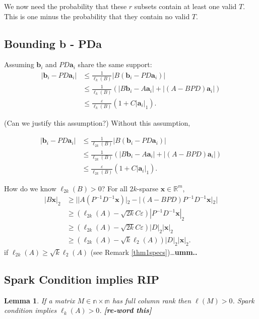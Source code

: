 \documentclass[journal, onecolumn]{IEEEtran}
\newtheorem{lemma}{Lemma}
\begin{document}
We now need the probability that these $r$ subsets contain at least one valid $T$.  This is one minus the probability that they contain no valid $T$. 

\subsection{Bounding b - PDa}

Assuming $\mathbf{b}_i$ and $PD\mathbf{a}_i$ share the same support:
\begin{align*}
|\mathbf{b}_i - PD\mathbf{a}_i| 
&\leq \frac{1}{\ell_{k}(B)}|B(\mathbf{b}_i - PD\mathbf{a}_i)| \\
&\leq \frac{1}{\ell_{k}(B)} (|B\mathbf{b}_i - A\mathbf{a}_i| + |(A - BPD)\mathbf{a}_i|) \\
&\leq \frac{\varepsilon}{\ell_{k}(B)}(1+C|\mathbf{a}_i|_1).
\end{align*}

(Can we justify this assumption?) Without this assumption,

\begin{align*}
|\mathbf{b}_i - PD\mathbf{a}_i| 
&\leq \frac{1}{\ell_{2k}(B)}|B(\mathbf{b}_i - PD\mathbf{a}_i)| \\
&\leq \frac{1}{\ell_{2k}(B)} (|B\mathbf{b}_i - A\mathbf{a}_i| + |(A - BPD)\mathbf{a}_i|) \\
&\leq \frac{\varepsilon}{\ell_{2k}(B)}(1+C|\mathbf{a}_i|_1).
\end{align*}

How do we know $\ell_{2k}(B) > 0$? For all $2k$-sparse $\mathbf{x} \in \mathbb{R}^m$,
\begin{align*}
|B\mathbf{x}|_2 
&\geq | |A(P^{-1}D^{-1}\mathbf{x})|_2 - |(A-BPD)P^{-1}D^{-1}\mathbf{x}|_2 | \\
&\geq (\ell_{2k}(A) - \sqrt{2k}C\varepsilon)|P^{-1}D^{-1}\mathbf{x}|_2 \\
&\geq (\ell_{2k}(A) - \sqrt{2k}C\varepsilon)|D|_2|\mathbf{x}|_2 \\
&\geq (\ell_{2k}(A) - \sqrt{k}\ell_2(A))|D|_2|\mathbf{x}|_2. 
\end{align*}
%
if $\ell_{2k}(A) \geq \sqrt{k}\ell_2(A)$ (see Remark \ref{thm1specs})\ldots\textbf{umm..} 

\subsection{Spark Condition implies RIP}

\begin{lemma}
If a matrix $M \in \mathbb{n \times m}$ has full column rank then $\ell(M) > 0$. Spark condition implies $\ell_k(A) > 0$. \textbf{[re-word this]}
\end{lemma}
\end{document}
